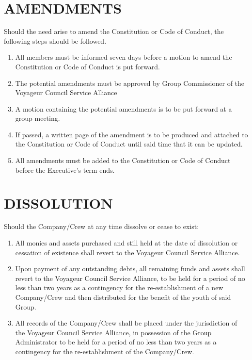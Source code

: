 \documentclass{Service_Corps_Document}
\begin{document}
    \section{AMENDMENTS}\label{sec:amendments}
    Should the need arise to amend the Constitution or Code of Conduct, the following steps should be followed.
    \begin{enumerate}
        \item All members must be informed seven days before a motion to amend the Constitution or Code of Conduct is put forward.
        \item The potential amendments must be approved by Group Commissioner of the Voyageur Council Service Alliance
        \item A motion containing the potential amendments is to be put forward at a group meeting.
        \item If passed, a written page of the amendment is to be produced and attached to the Constitution or Code of Conduct until said time that it can be updated.
        \item All amendments must be added to the Constitution or Code of Conduct before the Executive's term ends.
    \end{enumerate}


    \section{DISSOLUTION}\label{sec:dissolution}
    Should the Company/Crew at any time dissolve or cease to exist:
    \begin{enumerate}
        \item All monies and assets purchased and still held at the date of dissolution or cessation of existence shall revert to the Voyageur Council Service Alliance.
        \item Upon payment of any outstanding debts, all remaining funds and assets shall revert to the Voyageur Council Service Alliance, to be held for a period of no less than two years as a contingency for the re-establishment of a new Company/Crew and then distributed for the benefit of the youth of said Group.
        \item All records of the Company/Crew shall be placed under the jurisdiction of the Voyageur Council Service Alliance, in possession of the Group Administrator to be held for a period of no less than two years as a contingency for the re-establishment of the Company/Crew.
    \end{enumerate}
\end{document}
